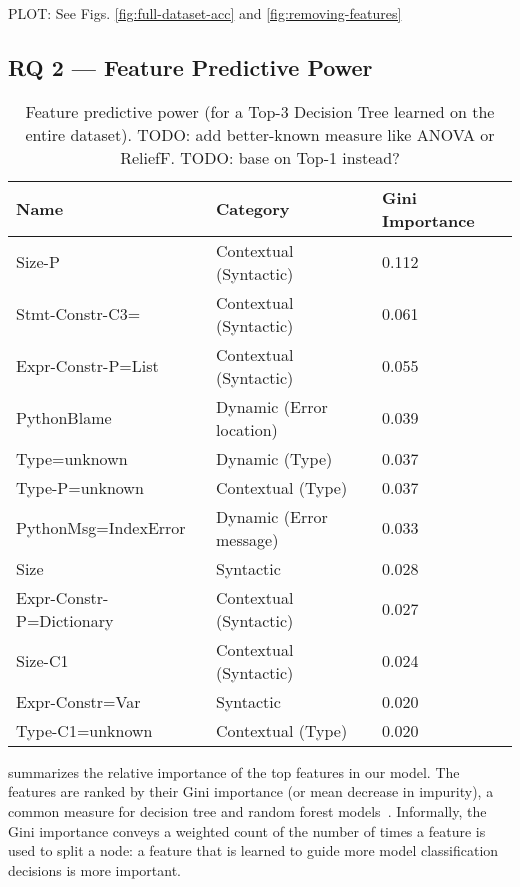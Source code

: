 \documentclass[conference]{IEEEtran}
\begin{document}
PLOT: See Figs. \ref{fig:full-dataset-acc} and \ref{fig:removing-features}

\subsection{RQ 2 --- Feature Predictive Power}

\begin{table}[]
\begin{tabular}{lll}
Name & Category & Gini Importance \\ \bottomrule
Size-P & Contextual (Syntactic)               & 0.112 \\
Stmt-Constr-C3= & Contextual (Syntactic)      & 0.061 \\
Expr-Constr-P=List & Contextual (Syntactic)   & 0.055 \\
PythonBlame & Dynamic (Error location)        & 0.039 \\
Type=unknown & Dynamic (Type)                 & 0.037 \\
Type-P=unknown & Contextual (Type)            & 0.037 \\
PythonMsg=IndexError & Dynamic (Error message)& 0.033 \\
Size & Syntactic                              & 0.028 \\
Expr-Constr-P=Dictionary & Contextual (Syntactic) & 0.027 \\
Size-C1 & Contextual (Syntactic)              & 0.024 \\
Expr-Constr=Var & Syntactic                   & 0.020 \\
Type-C1=unknown & Contextual (Type)           & 0.020 \\
\toprule
\end{tabular}
\caption{Feature predictive power (for a Top-3 Decision Tree
learned on the entire dataset).
TODO: add
better-known measure like ANOVA or ReliefF. TODO: base on Top-1 instead?}
\label{tab-feature-predictive-power}
\end{table}

 summarizes the relative importance
of the top features in our model. The features are ranked by their
Gini importance (or mean decrease in impurity), a common measure
for decision tree and random forest models~\cite{FIXME}. Informally, the
Gini importance conveys a weighted count of the number of times a feature
is used to split a node: a feature that is learned to guide more model
classification decisions is more important.
\end{document}
